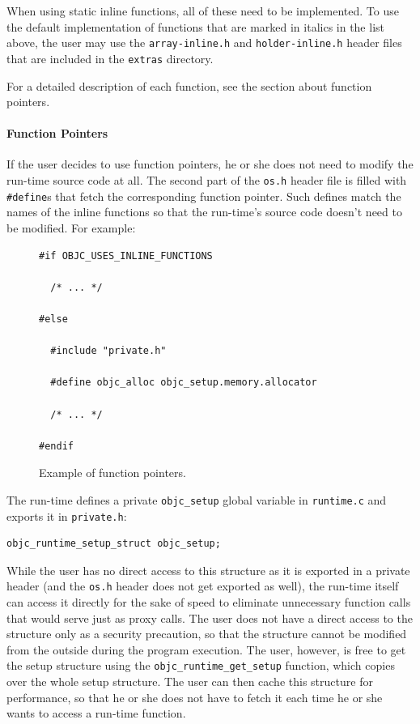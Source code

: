 When using static inline functions, all of these need to be implemented. To use the default implementation of functions that are marked in italics in the list above, the user may use the \verb=array-inline.h= and \verb=holder-inline.h= header files that are included in the \verb=extras= directory.

For a detailed description of each function, see the section about function pointers.

\paragraph{Function Pointers}

If the user decides to use function pointers, he or she does not need to modify the run-time source code at all. The second part of the \verb=os.h= header file is filled with \verb=#define=s that fetch the corresponding function pointer. Such defines match the names of the inline functions so that the run-time's source code doesn't need to be modified. For example:

\begin{figure}[H]
\begin{verbatim}
#if OBJC_USES_INLINE_FUNCTIONS

  /* ... */

#else

  #include "private.h"

  #define objc_alloc objc_setup.memory.allocator

  /* ... */

#endif

\end{verbatim}
\centering{}
\caption{Example of function pointers.}
\label{ref:function_ptrs_defs}
\end{figure}

The run-time defines a private \verb=objc_setup= global variable in \verb=runtime.c= and exports it in \verb=private.h=:
 
\begin{verbatim}
objc_runtime_setup_struct objc_setup;
\end{verbatim}

While the user has no direct access to this structure as it is exported in a private header (and the \verb=os.h= header does not get exported as well), the run-time itself can access it directly for the sake of speed to eliminate unnecessary function calls that would serve just as proxy calls. The user does not have a direct access to the structure only as a security precaution, so that the structure cannot be modified from the outside during the program execution. The user, however, is free to get the setup structure using the \verb=objc_runtime_get_setup= function, which copies over the whole setup structure. The user can then cache this structure for performance, so that he or she does not have to fetch it each time he or she wants to access a run-time function.

